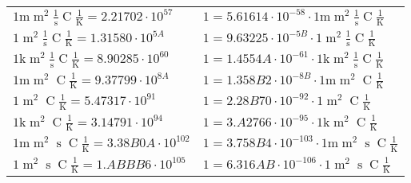 \begin{center}
\begin{longtable}{l l}
{\color{gray}$1 \bm{\mathrm{ m}}{\operatorname{m}^2}\frac1{\operatorname{s}}{\operatorname{C}}\frac1{\operatorname{K}} = 2.21702\cdot10^{57} $}   & {\color{gray}$ 1 = 5.61614\cdot10^{-58} \cdot 1 \bm{\mathrm{ m}}{\operatorname{m}^2}\frac1{\operatorname{s}}{\operatorname{C}}\frac1{\operatorname{K}}$}  \\
{\color{black}$1 \bm{\mathrm{ }}{\operatorname{m}^2}\frac1{\operatorname{s}}{\operatorname{C}}\frac1{\operatorname{K}} = 1.31580\cdot10^{5A} $}   & {\color{black}$ 1 = 9.63225\cdot10^{-5B} \cdot 1 \bm{\mathrm{ }}{\operatorname{m}^2}\frac1{\operatorname{s}}{\operatorname{C}}\frac1{\operatorname{K}}$}  \\
{\color{gray}$1 \bm{\mathrm{ k}}{\operatorname{m}^2}\frac1{\operatorname{s}}{\operatorname{C}}\frac1{\operatorname{K}} = 8.90285\cdot10^{60} $}   & {\color{gray}$ 1 = 1.4554A\cdot10^{-61} \cdot 1 \bm{\mathrm{ k}}{\operatorname{m}^2}\frac1{\operatorname{s}}{\operatorname{C}}\frac1{\operatorname{K}}$}  \\
{\color{gray}$1 \bm{\mathrm{ m}}{\operatorname{m}^2}{}{\operatorname{C}}\frac1{\operatorname{K}} = 9.37799\cdot10^{8A} $}   & {\color{gray}$ 1 = 1.358B2\cdot10^{-8B} \cdot 1 \bm{\mathrm{ m}}{\operatorname{m}^2}{}{\operatorname{C}}\frac1{\operatorname{K}}$}  \\
{\color{black}$1 \bm{\mathrm{ }}{\operatorname{m}^2}{}{\operatorname{C}}\frac1{\operatorname{K}} = 5.47317\cdot10^{91} $}   & {\color{black}$ 1 = 2.28B70\cdot10^{-92} \cdot 1 \bm{\mathrm{ }}{\operatorname{m}^2}{}{\operatorname{C}}\frac1{\operatorname{K}}$}  \\
{\color{gray}$1 \bm{\mathrm{ k}}{\operatorname{m}^2}{}{\operatorname{C}}\frac1{\operatorname{K}} = 3.14791\cdot10^{94} $}   & {\color{gray}$ 1 = 3.A2766\cdot10^{-95} \cdot 1 \bm{\mathrm{ k}}{\operatorname{m}^2}{}{\operatorname{C}}\frac1{\operatorname{K}}$}  \\
{\color{gray}$1 \bm{\mathrm{ m}}{\operatorname{m}^2}{\operatorname{s}}{\operatorname{C}}\frac1{\operatorname{K}} = 3.38B0A\cdot10^{102} $}   & {\color{gray}$ 1 = 3.758B4\cdot10^{-103} \cdot 1 \bm{\mathrm{ m}}{\operatorname{m}^2}{\operatorname{s}}{\operatorname{C}}\frac1{\operatorname{K}}$}  \\
{\color{black}$1 \bm{\mathrm{ }}{\operatorname{m}^2}{\operatorname{s}}{\operatorname{C}}\frac1{\operatorname{K}} = 1.ABBB6\cdot10^{105} $}   & {\color{black}$ 1 = 6.316AB\cdot10^{-106} \cdot 1 \bm{\mathrm{ }}{\operatorname{m}^2}{\operatorname{s}}{\operatorname{C}}\frac1{\operatorname{K}}$}  \\

\end{longtable}
\end{center}
